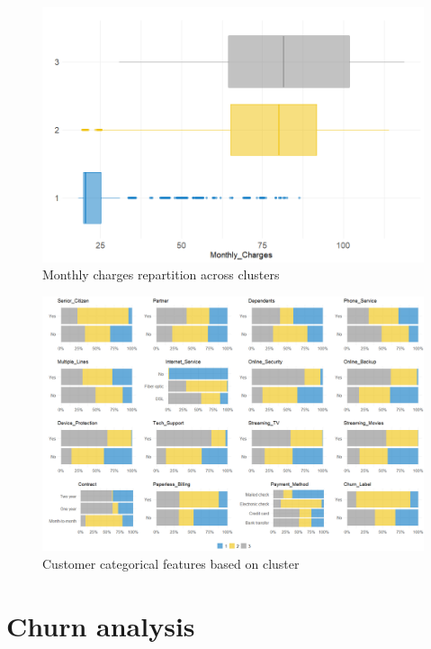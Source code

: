 \documentclass[
]{book}
\begin{document}
\begin{figure}

{\centering \includegraphics[width=12.5in]{./imgs/monthly_charges_clust} 

}

\caption{Monthly charges repartition across clusters}\label{fig:monthlychargesclust}
\end{figure}

\begin{figure}

{\centering \includegraphics[width=20.83in]{./imgs/cat_vars_clust} 

}

\caption{Customer categorical features based on cluster}\label{fig:catvarsclust}
\end{figure}

\hypertarget{churn-analysis}{%
\section{Churn analysis}\label{churn-analysis}}
\end{document}
